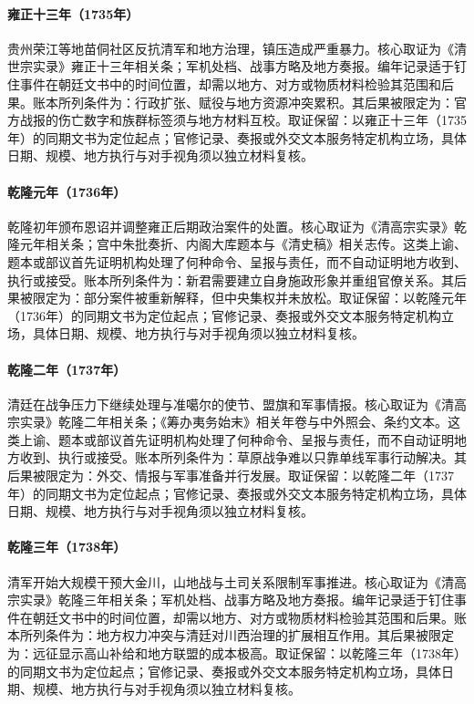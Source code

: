\hypertarget{ledger:EQ-1735-MIAO-UPRISING-RONGJIANG}{}\paragraph{雍正十三年（1735年）}贵州荣江等地苗侗社区反抗清军和地方治理，镇压造成严重暴力。核心取证为《清世宗实录》雍正十三年相关条；军机处档、战事方略及地方奏报。编年记录适于钉住事件在朝廷文书中的时间位置，却需以地方、对方或物质材料检验其范围和后果。账本所列条件为：行政扩张、赋役与地方资源冲突累积。其后果被限定为：官方战报的伤亡数字和族群标签须与地方材料互校。取证保留：以雍正十三年（1735年）的同期文书为定位起点；官修记录、奏报或外交文本服务特定机构立场，具体日期、规模、地方执行与对手视角须以独立材料复核。
\hypertarget{ledger:EQ-1736-AMNESTY-AND-RECTIFICATION}{}\paragraph{乾隆元年（1736年）}乾隆初年颁布恩诏并调整雍正后期政治案件的处置。核心取证为《清高宗实录》乾隆元年相关条；宫中朱批奏折、内阁大库题本与《清史稿》相关志传。这类上谕、题本或部议首先证明机构处理了何种命令、呈报与责任，而不自动证明地方收到、执行或接受。账本所列条件为：新君需要建立自身施政形象并重组官僚关系。其后果被限定为：部分案件被重新解释，但中央集权并未放松。取证保留：以乾隆元年（1736年）的同期文书为定位起点；官修记录、奏报或外交文本服务特定机构立场，具体日期、规模、地方执行与对手视角须以独立材料复核。
\hypertarget{ledger:EQ-1737-Dzungar-NEGOTIATION}{}\paragraph{乾隆二年（1737年）}清廷在战争压力下继续处理与准噶尔的使节、盟旗和军事情报。核心取证为《清高宗实录》乾隆二年相关条；《筹办夷务始末》相关年卷与中外照会、条约文本。这类上谕、题本或部议首先证明机构处理了何种命令、呈报与责任，而不自动证明地方收到、执行或接受。账本所列条件为：草原战争难以只靠单线军事行动解决。其后果被限定为：外交、情报与军事准备并行发展。取证保留：以乾隆二年（1737年）的同期文书为定位起点；官修记录、奏报或外交文本服务特定机构立场，具体日期、规模、地方执行与对手视角须以独立材料复核。
\hypertarget{ledger:EQ-1738-FIRST-JINCHUAN-WAR}{}\paragraph{乾隆三年（1738年）}清军开始大规模干预大金川，山地战与土司关系限制军事推进。核心取证为《清高宗实录》乾隆三年相关条；军机处档、战事方略及地方奏报。编年记录适于钉住事件在朝廷文书中的时间位置，却需以地方、对方或物质材料检验其范围和后果。账本所列条件为：地方权力冲突与清廷对川西治理的扩展相互作用。其后果被限定为：远征显示高山补给和地方联盟的成本极高。取证保留：以乾隆三年（1738年）的同期文书为定位起点；官修记录、奏报或外交文本服务特定机构立场，具体日期、规模、地方执行与对手视角须以独立材料复核。
